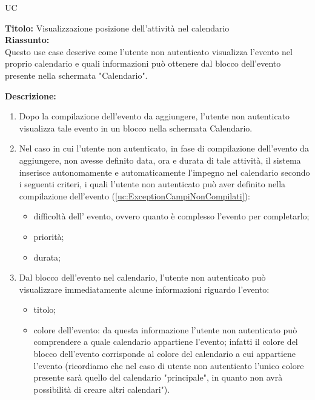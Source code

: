 \begin{listaPersonale}{UC}
    \begin{listaPersonale2} [UC] {}
        \textbf{Titolo:} Visualizzazione posizione dell'attività nel calendario \\
        \textbf{Riassunto: } \\
        Questo use case descrive come l'utente non autenticato visualizza l'evento nel proprio calendario e quali informazioni può ottenere dal blocco dell'evento presente nella schermata "Calendario".

        \textbf{Descrizione: }
        \begin{enumerate}
            \item Dopo la compilazione dell'evento da aggiungere, l'utente non autenticato visualizza tale evento in un blocco nella schermata Calendario.
            \item Nel caso in cui l'utente non autenticato, in fase di compilazione dell'evento da aggiungere, non avesse definito data, ora e durata di tale attività, il sistema inserisce autonomamente e automaticamente l'impegno nel calendario secondo i seguenti criteri, i quali l'utente non autenticato può aver definito nella compilazione dell'evento (\ref{uc:ExceptionCampiNonCompilati}):
                  \begin{itemize}
                      \item difficoltà dell' evento, ovvero quanto è complesso l'evento per completarlo;
                      \item priorità;
                      \item durata;
                  \end{itemize}
            \item Dal blocco dell'evento nel calendario, l'utente non autenticato può visualizzare immediatamente alcune informazioni riguardo l'evento:
                  \begin{itemize}
                      \item titolo;
                      \item colore dell'evento: da questa informazione l'utente non autenticato può comprendere a quale calendario appartiene l'evento; infatti il colore del blocco dell'evento corrisponde al colore del calendario a cui appartiene l'evento (ricordiamo che nel caso di utente non autenticato l'unico colore presente sarà quello del calendario "principale", in quanto non avrà possibilità di creare altri calendari").

\end{itemize}
\end{enumerate}
\end{listaPersonale2}
\end{listaPersonale}
